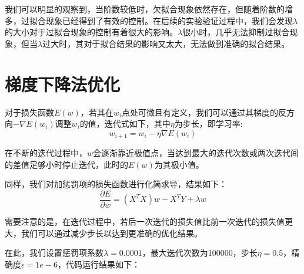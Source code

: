 \documentclass[12pt]{article}
\begin{document}
我们可以明显的观察到，当阶数较低时，欠拟合现象依然存在，但随着阶数的增多，过拟合现象已经得到了有效的控制。在后续的实验验证过程中，我们会发现$\lambda$的大小对于过拟合现象的控制有着很大的影响。$\lambda$很小时，几乎无法抑制过拟合现象，但当$\lambda$过大时，其对于拟合结果的影响又太大，无法做到准确的拟合结果。\par
\section{梯度下降法优化}
对于损失函数$E(w)$，若其在$w_i$点处可微且有定义，我们可以通过其梯度的反方向$-\nabla E(w_i)$调整$w_i$的值，迭代式如下，其中$\eta$为步长，即学习率:
\[w_{i+1}=w_i-\eta\nabla E(w_i)\]\par
在不断的迭代过程中，$w$会逐渐靠近极值点，当达到最大的迭代次数或两次迭代间的差值足够小时停止迭代，此时的$E(w)$为其极小值。\par
同样，我们对加惩罚项的损失函数进行化简求导，结果如下：
\[\frac{\partial{E}}{\partial w}=(X^TX)w-X^TY+\lambda w\]\par
需要注意的是，在迭代过程中，若后一次迭代的损失值比前一次迭代的损失值更大，我们可以通过减少步长以达到更准确的优化结果。\par
在此，我们设置惩罚项系数$\lambda = 0.0001$，最大迭代次数为100000，步长$\eta=0.5$，精确度$\epsilon = 1e-6$，代码运行结果如下：
\end{document}
